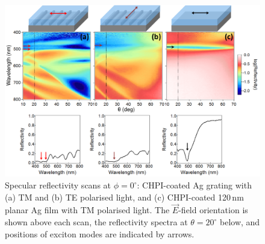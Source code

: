 \begin{figure}[h!] 
\centering    
\includegraphics[width=\textwidth]{Fig15}
\caption{Specular reflectivity scans at $\phi=0^{\circ}$: CHPI-coated Ag grating with (a) TM and (b) TE polarised light, and (c) CHPI-coated 120\,nm planar Ag film with TM polarised light. The $\vec{E}$-field orientation is shown above each scan, the reflectivity spectra at $\theta=20^{\circ}$ below, and positions of exciton modes are indicated by arrows.}
\label{7Fig15}
\end{figure}

